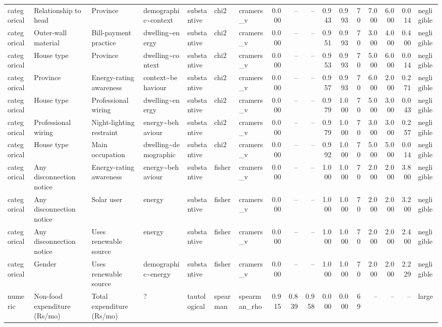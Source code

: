 \begin{table}
\begin{tabular}{lllllllrrrrrrrrrl}
categorical & Relationship to head & Province & demographic\textasciitilde context & substantive & chi2 & cramers\_v & 0.000 & -- & -- & 0.943 & 0.993 & 70 & 7.000 & 6.000 & 0.014 & negligible \\
categorical & Outer-wall material & Bill-payment practice & dwelling\textasciitilde energy & substantive & chi2 & cramers\_v & 0.000 & -- & -- & 0.951 & 0.993 & 70 & 3.000 & 4.000 & 0.400 & negligible \\
categorical & House type & Province & dwelling\textasciitilde context & substantive & chi2 & cramers\_v & 0.000 & -- & -- & 0.953 & 0.993 & 70 & 5.000 & 6.000 & 0.014 & negligible \\
categorical & Province & Energy-rating awareness & context\textasciitilde behaviour & substantive & chi2 & cramers\_v & 0.000 & -- & -- & 0.957 & 0.993 & 70 & 6.000 & 2.000 & 0.271 & negligible \\
categorical & House type & Professional wiring & dwelling\textasciitilde energy & substantive & chi2 & cramers\_v & 0.000 & -- & -- & 0.979 & 1.000 & 70 & 5.000 & 3.000 & 0.043 & negligible \\
categorical & Professional wiring & Night-lighting restraint & energy\textasciitilde behaviour & substantive & chi2 & cramers\_v & 0.000 & -- & -- & 0.979 & 1.000 & 70 & 3.000 & 3.000 & 0.257 & negligible \\
categorical & House type & Main occupation & dwelling\textasciitilde demographic & substantive & chi2 & cramers\_v & 0.000 & -- & -- & 0.992 & 1.000 & 70 & 5.000 & 5.000 & 0.014 & negligible \\
categorical & Any disconnection notice & Energy-rating awareness & energy\textasciitilde behaviour & substantive & fisher & cramers\_v & 0.000 & -- & -- & 1.000 & 1.000 & 70 & 2.000 & 2.000 & 3.800 & negligible \\
categorical & Any disconnection notice & Solar user & energy & substantive & fisher & cramers\_v & 0.000 & -- & -- & 1.000 & 1.000 & 70 & 2.000 & 2.000 & 3.200 & negligible \\
categorical & Any disconnection notice & Uses renewable source & energy & substantive & fisher & cramers\_v & 0.000 & -- & -- & 1.000 & 1.000 & 70 & 2.000 & 2.000 & 2.400 & negligible \\
categorical & Gender & Uses renewable source & demographic\textasciitilde energy & substantive & fisher & cramers\_v & 0.000 & -- & -- & 1.000 & 1.000 & 70 & 2.000 & 2.000 & 2.229 & negligible \\
numeric & Non-food expenditure (Rs/mo) & Total expenditure (Rs/mo) & ? & tautological & spearman & spearman\_rho & 0.915 & 0.839 & 0.958 & 0.000 & 0.000 & 69 & -- & -- & -- & large \\

\end{tabular}
\end{table}
